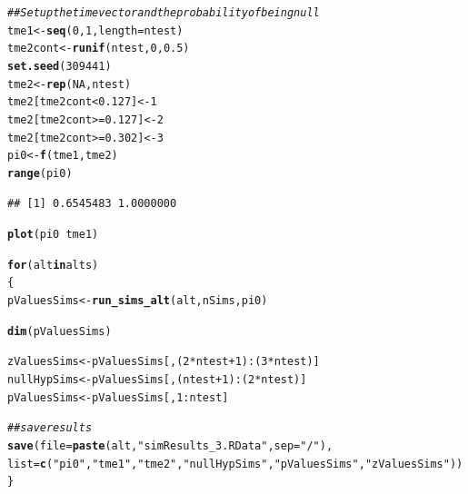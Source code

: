 \documentclass{article}\usepackage[]{graphicx}\usepackage[]{color}
\makeatletter
\newcommand{\hlnum}[1]{\textcolor[rgb]{0.686,0.059,0.569}{#1}}%
\newcommand{\hlstr}[1]{\textcolor[rgb]{0.192,0.494,0.8}{#1}}%
\newcommand{\hlcom}[1]{\textcolor[rgb]{0.678,0.584,0.686}{\textit{#1}}}%
\newcommand{\hlopt}[1]{\textcolor[rgb]{0,0,0}{#1}}%
\newcommand{\hlstd}[1]{\textcolor[rgb]{0.345,0.345,0.345}{#1}}%
\newcommand{\hlkwa}[1]{\textcolor[rgb]{0.161,0.373,0.58}{\textbf{#1}}}%
\newcommand{\hlkwb}[1]{\textcolor[rgb]{0.69,0.353,0.396}{#1}}%
\newcommand{\hlkwc}[1]{\textcolor[rgb]{0.333,0.667,0.333}{#1}}%
\newcommand{\hlkwd}[1]{\textcolor[rgb]{0.737,0.353,0.396}{\textbf{#1}}}%
\newenvironment{kframe}{%
 \def\at@end@of@kframe{}%
 \ifinner\ifhmode%
  \def\at@end@of@kframe{\end{minipage}}%
  \begin{minipage}{\columnwidth}%
 \fi\fi%
 \def\FrameCommand##1{\hskip\@totalleftmargin \hskip-\fboxsep
 \colorbox{shadecolor}{##1}\hskip-\fboxsep
     \hskip-\linewidth \hskip-\@totalleftmargin \hskip\columnwidth}%
 \MakeFramed {\advance\hsize-\width
   \@totalleftmargin\z@ \linewidth\hsize
   \@setminipage}}%
 {\par\unskip\endMakeFramed%
 \at@end@of@kframe}
\newenvironment{knitrout}{}{} %
\makeatother
\begin{document}
\begin{knitrout}
\color{fgcolor}\begin{kframe}
\begin{alltt}
\hlcom{## Set up the time vector and the probability of being null}
\hlstd{tme1} \hlkwb{<-} \hlkwd{seq}\hlstd{(}\hlnum{0}\hlstd{,}\hlnum{1}\hlstd{,}\hlkwc{length}\hlstd{=ntest)}
\hlstd{tme2cont} \hlkwb{<-} \hlkwd{runif}\hlstd{(ntest,}\hlnum{0}\hlstd{,}\hlnum{0.5}\hlstd{)}
\hlkwd{set.seed}\hlstd{(}\hlnum{309441}\hlstd{)}
\hlstd{tme2} \hlkwb{<-} \hlkwd{rep}\hlstd{(}\hlnum{NA}\hlstd{, ntest)}
\hlstd{tme2[tme2cont} \hlopt{<} \hlnum{0.127}\hlstd{]} \hlkwb{<-} \hlnum{1}
\hlstd{tme2[tme2cont} \hlopt{>=} \hlnum{0.127}\hlstd{]} \hlkwb{<-} \hlnum{2}
\hlstd{tme2[tme2cont} \hlopt{>=} \hlnum{0.302}\hlstd{]} \hlkwb{<-} \hlnum{3}
\hlstd{pi0} \hlkwb{<-} \hlkwd{f}\hlstd{(tme1, tme2)}
\hlkwd{range}\hlstd{(pi0)}
\end{alltt}
\begin{verbatim}
## [1] 0.6545483 1.0000000
\end{verbatim}
\begin{alltt}
\hlkwd{plot}\hlstd{(pi0} \hlopt{~} \hlstd{tme1)}

\hlkwa{for}\hlstd{(alt} \hlkwa{in} \hlstd{alts)}
\hlstd{\{}
  \hlstd{pValuesSims} \hlkwb{<-} \hlkwd{run_sims_alt}\hlstd{(alt, nSims, pi0)}

  \hlkwd{dim}\hlstd{(pValuesSims)}

  \hlstd{zValuesSims} \hlkwb{<-} \hlstd{pValuesSims[,(}\hlnum{2}\hlopt{*}\hlstd{ntest}\hlopt{+}\hlnum{1}\hlstd{)}\hlopt{:}\hlstd{(}\hlnum{3}\hlopt{*}\hlstd{ntest)]}
  \hlstd{nullHypSims} \hlkwb{<-} \hlstd{pValuesSims[,(ntest}\hlopt{+}\hlnum{1}\hlstd{)}\hlopt{:}\hlstd{(}\hlnum{2}\hlopt{*}\hlstd{ntest)]}
  \hlstd{pValuesSims} \hlkwb{<-} \hlstd{pValuesSims[,}\hlnum{1}\hlopt{:}\hlstd{ntest]}

  \hlcom{##save results}
  \hlkwd{save}\hlstd{(}\hlkwc{file}\hlstd{=}\hlkwd{paste}\hlstd{(alt,} \hlstr{"simResults_3.RData"}\hlstd{,}\hlkwc{sep}\hlstd{=}\hlstr{"/"}\hlstd{),}
       \hlkwc{list}\hlstd{=}\hlkwd{c}\hlstd{(}\hlstr{"pi0"}\hlstd{,} \hlstr{"tme1"}\hlstd{,} \hlstr{"tme2"}\hlstd{,} \hlstr{"nullHypSims"}\hlstd{,}\hlstr{"pValuesSims"}\hlstd{,}\hlstr{"zValuesSims"}\hlstd{))}
\hlstd{\}}
\end{alltt}
\end{kframe}


\end{knitrout}
\end{document}
